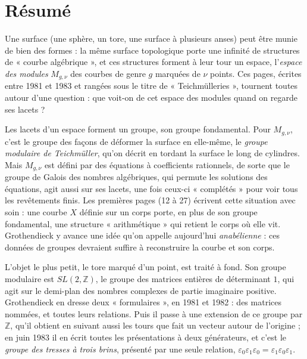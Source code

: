 \documentclass[11pt,a4paper]{article}
\begin{document}
\section*{Résumé}

\begin{resume}
Une surface (une sphère, un tore, une surface à plusieurs anses) peut être
munie de bien des formes : la même surface topologique porte une infinité de
structures de « courbe algébrique », et ces structures forment à leur tour un
espace, l'\emph{espace des modules} $M_{g,\nu}$ des courbes de genre $g$
marquées de $\nu$ points. Ces pages, écrites entre 1981 et 1983 et rangées
sous le titre de « Teichmülleries », tournent toutes autour d'une question :
que voit-on de cet espace des modules quand on regarde ses lacets ?

Les lacets d'un espace forment un groupe, son groupe fondamental. Pour
$M_{g,\nu}$, c'est le groupe des façons de déformer la surface en elle-même,
le \emph{groupe modulaire de Teichmüller}, qu'on décrit en tordant la surface
le long de cylindres. Mais $M_{g,\nu}$ est défini par des équations à
coefficients rationnels, de sorte que le groupe de Galois des
nombres algébriques, qui permute les solutions des équations, agit aussi sur
ses lacets, une fois ceux-ci « complétés » pour voir tous les revêtements
finis. Les premières pages (12 à 27) écrivent cette situation avec soin : une
courbe $X$ définie sur un corps porte, en plus de son groupe fondamental, une
structure « arithmétique » qui retient le corps où elle vit. Grothendieck y
avance une idée qu'on appelle aujourd'hui \emph{anabélienne} : ces données
de groupes devraient suffire à reconstruire la courbe et son corps.

L'objet le plus petit, le tore marqué d'un point, est traité à fond. Son
groupe modulaire est $SL(2, \mathbb{Z})$, le groupe des matrices entières de
déterminant $1$, qui agit sur le demi-plan des nombres complexes de partie
imaginaire positive. Grothendieck en dresse deux « formulaires », en 1981 et
1982 : des matrices nommées, et toutes leurs relations. Puis il passe à une
extension de ce groupe par $\mathbb{Z}$, qu'il obtient en suivant aussi les
tours que fait un vecteur autour de l'origine ; en juin 1983 il en écrit
toutes les présentations à deux générateurs, et c'est le \emph{groupe des
tresses à trois brins}, présenté par une seule relation,
$\varepsilon_0\varepsilon_1\varepsilon_0 = \varepsilon_1\varepsilon_0\varepsilon_1$.


\end{resume}
\end{document}
